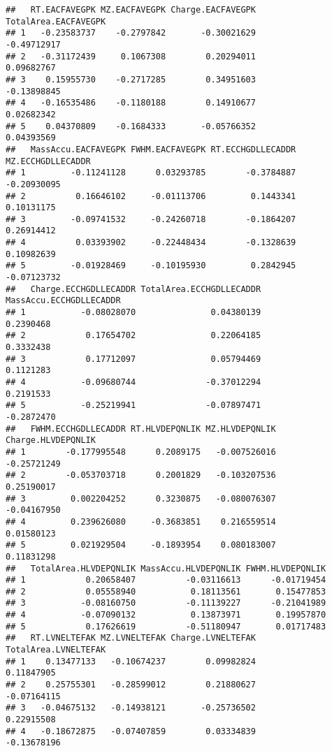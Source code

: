 \documentclass[]{article}
\begin{document}
\begin{verbatim}
##   RT.EACFAVEGPK MZ.EACFAVEGPK Charge.EACFAVEGPK TotalArea.EACFAVEGPK
## 1   -0.23583737    -0.2797842       -0.30021629          -0.49712917
## 2   -0.31172439     0.1067308        0.20294011           0.09682767
## 3    0.15955730    -0.2717285        0.34951603          -0.13898845
## 4   -0.16535486    -0.1180188        0.14910677           0.02682342
## 5    0.04370809    -0.1684333       -0.05766352           0.04393569
##   MassAccu.EACFAVEGPK FWHM.EACFAVEGPK RT.ECCHGDLLECADDR MZ.ECCHGDLLECADDR
## 1         -0.11241128      0.03293785        -0.3784887       -0.20930095
## 2          0.16646102     -0.01113706         0.1443341        0.10131175
## 3         -0.09741532     -0.24260718        -0.1864207        0.26914412
## 4          0.03393902     -0.22448434        -0.1328639        0.10982639
## 5         -0.01928469     -0.10195930         0.2842945       -0.07123732
##   Charge.ECCHGDLLECADDR TotalArea.ECCHGDLLECADDR MassAccu.ECCHGDLLECADDR
## 1           -0.08028070               0.04380139               0.2390468
## 2            0.17654702               0.22064185               0.3332438
## 3            0.17712097               0.05794469               0.1121283
## 4           -0.09680744              -0.37012294               0.2191533
## 5           -0.25219941              -0.07897471              -0.2872470
##   FWHM.ECCHGDLLECADDR RT.HLVDEPQNLIK MZ.HLVDEPQNLIK Charge.HLVDEPQNLIK
## 1        -0.177995548      0.2089175   -0.007526016        -0.25721249
## 2        -0.053703718      0.2001829   -0.103207536         0.25190017
## 3         0.002204252      0.3230875   -0.080076307        -0.04167950
## 4         0.239626080     -0.3683851    0.216559514         0.01580123
## 5         0.021929504     -0.1893954    0.080183007         0.11831298
##   TotalArea.HLVDEPQNLIK MassAccu.HLVDEPQNLIK FWHM.HLVDEPQNLIK
## 1            0.20658407          -0.03116613      -0.01719454
## 2            0.05558940           0.18113561       0.15477853
## 3           -0.08160750          -0.11139227      -0.21041989
## 4           -0.07090132           0.13873971       0.19957870
## 5            0.17626619          -0.51180947       0.01717483
##   RT.LVNELTEFAK MZ.LVNELTEFAK Charge.LVNELTEFAK TotalArea.LVNELTEFAK
## 1    0.13477133   -0.10674237        0.09982824           0.11847905
## 2    0.25755301   -0.28599012        0.21880627          -0.07164115
## 3   -0.04675132   -0.14938121       -0.25736502           0.22915508
## 4   -0.18672875   -0.07407859        0.03334839          -0.13678196

\end{verbatim}
\end{document}
